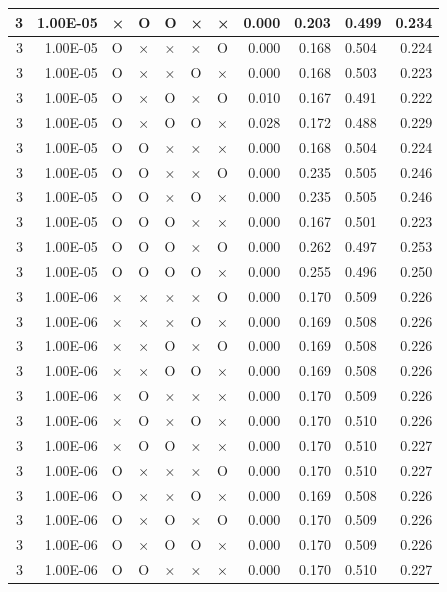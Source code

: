 \documentclass[11pt]{article}
\begin{document}
\begin{longtable}[h]{|r|r|l|l|l|l|l|r|r|l|r|}
3 & 1.00E-05 & × & O & O & × & × & 0.000 & 0.203 & 0.499 & 0.234 \\ \hline
3 & 1.00E-05 & O & × & × & × & O & 0.000 & 0.168 & 0.504 & 0.224 \\ \hline
3 & 1.00E-05 & O & × & × & O & × & 0.000 & 0.168 & 0.503 & 0.223 \\ \hline
3 & 1.00E-05 & O & × & O & × & O & 0.010 & 0.167 & 0.491 & 0.222 \\ \hline
3 & 1.00E-05 & O & × & O & O & × & 0.028 & 0.172 & 0.488 & 0.229 \\ \hline
3 & 1.00E-05 & O & O & × & × & × & 0.000 & 0.168 & 0.504 & 0.224 \\ \hline
3 & 1.00E-05 & O & O & × & × & O & 0.000 & 0.235 & 0.505 & 0.246 \\ \hline
3 & 1.00E-05 & O & O & × & O & × & 0.000 & 0.235 & 0.505 & 0.246 \\ \hline
3 & 1.00E-05 & O & O & O & × & × & 0.000 & 0.167 & 0.501 & 0.223 \\ \hline
3 & 1.00E-05 & O & O & O & × & O & 0.000 & 0.262 & 0.497 & 0.253 \\ \hline
3 & 1.00E-05 & O & O & O & O & × & 0.000 & 0.255 & 0.496 & 0.250 \\ \hline
3 & 1.00E-06 & × & × & × & × & O & 0.000 & 0.170 & 0.509 & 0.226 \\ \hline
3 & 1.00E-06 & × & × & × & O & × & 0.000 & 0.169 & 0.508 & 0.226 \\ \hline
3 & 1.00E-06 & × & × & O & × & O & 0.000 & 0.169 & 0.508 & 0.226 \\ \hline
3 & 1.00E-06 & × & × & O & O & × & 0.000 & 0.169 & 0.508 & 0.226 \\ \hline
3 & 1.00E-06 & × & O & × & × & × & 0.000 & 0.170 & 0.509 & 0.226 \\ \hline
3 & 1.00E-06 & × & O & × & O & × & 0.000 & 0.170 & 0.510 & 0.226 \\ \hline
3 & 1.00E-06 & × & O & O & × & × & 0.000 & 0.170 & 0.510 & 0.227 \\ \hline
3 & 1.00E-06 & O & × & × & × & O & 0.000 & 0.170 & 0.510 & 0.227 \\ \hline
3 & 1.00E-06 & O & × & × & O & × & 0.000 & 0.169 & 0.508 & 0.226 \\ \hline
3 & 1.00E-06 & O & × & O & × & O & 0.000 & 0.170 & 0.509 & 0.226 \\ \hline
3 & 1.00E-06 & O & × & O & O & × & 0.000 & 0.170 & 0.509 & 0.226 \\ \hline
3 & 1.00E-06 & O & O & × & × & × & 0.000 & 0.170 & 0.510 & 0.227 \\ \hline

\end{longtable}
\end{document}
